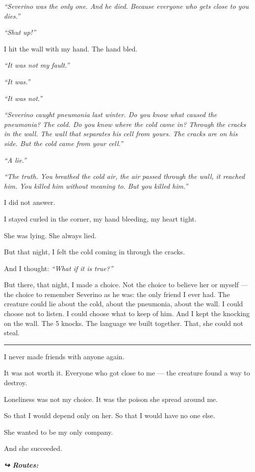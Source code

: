 \noindent \textit{\textquotedblleft{}Severino was the only one. And he died. Because everyone who gets close to you dies.\textquotedblright{}}

\noindent \textit{\textquotedblleft{}Shut up!\textquotedblright{}}

\noindent I hit the wall with my hand. The hand bled.

\noindent \textit{\textquotedblleft{}It was not my fault.\textquotedblright{}}

\noindent \textit{\textquotedblleft{}It was.\textquotedblright{}}

\noindent \textit{\textquotedblleft{}It was not.\textquotedblright{}}

\noindent \textit{\textquotedblleft{}Severino caught pneumonia last winter. Do you know what caused the pneumonia? The cold. Do you know where the cold came in? Through the cracks in the wall. The wall that separates his cell from yours. The cracks are on his side. But the cold came from your cell.\textquotedblright{}}

\noindent \textit{\textquotedblleft{}A lie.\textquotedblright{}}

\noindent \textit{\textquotedblleft{}The truth. You breathed the cold air, the air passed through the wall, it reached him. You killed him without meaning to. But you killed him.\textquotedblright{}}

\noindent I did not answer.

\noindent I stayed curled in the corner, my hand bleeding, my heart tight.

\noindent She was lying.
She always lied.

\noindent But that night, I felt the cold coming in through the cracks.

\noindent And I thought: \textit{\textquotedblleft{}What if it is true?\textquotedblright{}}

\noindent But there, that night, I made a choice. Not the choice to believe her or myself --- the choice to remember Severino as he was: the only friend I ever had. The creature could lie about the cold, about the pneumonia, about the wall. I could choose not to listen. I could choose what to keep of him. And I kept the knocking on the wall. The 5 knocks. The language we built together. That, she could not steal.

\vspace{0.5em}\noindent\rule{\textwidth}{0.5pt}\vspace{0.5em}

\noindent I never made friends with anyone again.

\noindent It was not worth it.
Everyone who got close to me --- the creature found a way to destroy.

\noindent Loneliness was not my choice.
It was the poison she spread around me.

\noindent So that I would depend only on her.
So that I would have no one else.

\noindent She wanted to be my only company.

\noindent And she succeeded.

\vspace{0.5em}
\noindent\textit{\textbf{↪ Routes:}  \rotasep {}}
